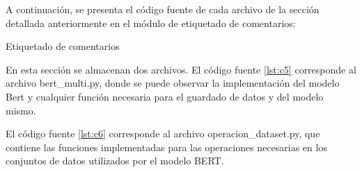 A continuación, se presenta el código fuente de cada archivo de la sección detallada anteriormente en el módulo de etiquetado de comentarios:

Etiquetado de comentarios

En esta sección se almacenan dos archivos. El código fuente \ref{lst:c5} corresponde al archivo bert\_multi.py, donde se puede observar la implementación del modelo Bert y cualquier función necesaria para el guardado de datos y del modelo mismo.




El código fuente \ref{lst:c6} corresponde al archivo operacion\_dataset.py, que contiene las funciones implementadas para las operaciones necesarias en los conjuntos de datos utilizados por el modelo BERT.


